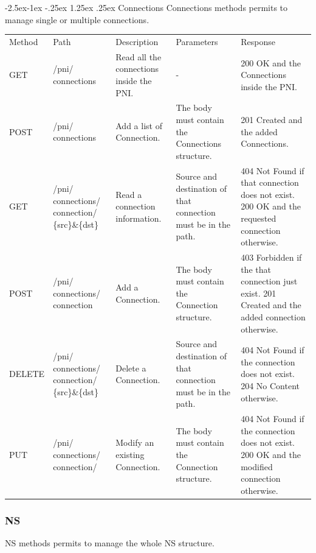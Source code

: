 \documentclass[11pt, english]{article}
\makeatletter
\renewcommand\paragraph{\@startsection{paragraph}{4}{\z@}%
            {-2.5ex\@plus -1ex \@minus -.25ex}%
            {1.25ex \@plus .25ex}%
            {\normalfont\normalsize\bfseries}}
\makeatother
\begin{document}
\paragraph{Connections}
Connections methods permits to manage single or multiple connections. \\

\begin{tabular}{ |p{2cm}|m{3cm}|p{3cm}|p{3cm}|p{4cm}| }
    \hline
    \rowcolor{black} \multicolumn{5}{|c|}{\textcolor{white}{Connections}} \\
    \hline
    \rowcolor{Gray}
    Method & Path & Description & Parameters & Response \\
    \hline
    GET   & /pni/ connections & Read all the connections inside the PNI. & - & 200 OK and the Connections inside the PNI. \\
    \hline
    POST & /pni/ connections & Add a list of Connection. & The body must contain the Connections structure. & 201 Created and the added Connections. \\
    \hline
    GET & /pni/ connections/ connection/ \{src\}\&\{dst\} & Read a connection information. & Source and destination of that connection must be in the path. & 404 Not Found if that connection does not exist. 200 OK and the requested connection otherwise. \\
    \hline
    POST & /pni/ connections/ connection & Add a Connection. & The body must contain the Connection structure. & 403 Forbidden if the that connection just exist. 201 Created and the added connection otherwise. \\
    \hline
    DELETE & /pni/ connections/ connection/ \{src\}\&\{dst\} & Delete a Connection. & Source and destination of that connection must be in the path. & 404 Not Found if the connection does not exist. 204 No Content otherwise. \\
    \hline
    PUT & /pni/ connections/ connection/ & Modify an existing Connection. & The body must contain the Connection structure. & 404 Not Found if the connection does not exist. 200 OK and the modified connection otherwise. \\
    \hline
\end{tabular}

\newpage
\subsubsection{NS}
NS methods permits to manage the whole NS structure. \\
\end{document}
